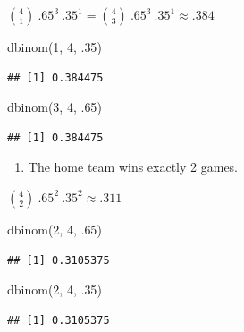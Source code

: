 \documentclass[
]{book}
\newenvironment{Shaded}{\begin{snugshade}}{\end{snugshade}}
\newcommand{\DecValTok}[1]{\textcolor[rgb]{0.00,0.00,0.81}{#1}}
\newcommand{\FunctionTok}[1]{\textcolor[rgb]{0.00,0.00,0.00}{#1}}
\newcommand{\NormalTok}[1]{#1}
\providecommand{\tightlist}{%
  \setlength{\itemsep}{0pt}\setlength{\parskip}{0pt}}
\theoremstyle{definition}
\theoremstyle{definition}
\theoremstyle{definition}
\theoremstyle{definition}
\theoremstyle{remark}
\begin{document}
\(\binom{4}{1}\ .65^3\ .35^1 = \binom{4}{3}\ .65^3\ .35^1 \approx .384\)

\begin{Shaded}
\begin{Highlighting}[]
\FunctionTok{dbinom}\NormalTok{(}\DecValTok{1}\NormalTok{, }\DecValTok{4}\NormalTok{, .}\DecValTok{35}\NormalTok{)}
\end{Highlighting}
\end{Shaded}

\begin{verbatim}
## [1] 0.384475
\end{verbatim}

\begin{Shaded}
\begin{Highlighting}[]
\FunctionTok{dbinom}\NormalTok{(}\DecValTok{3}\NormalTok{, }\DecValTok{4}\NormalTok{, .}\DecValTok{65}\NormalTok{)}
\end{Highlighting}
\end{Shaded}

\begin{verbatim}
## [1] 0.384475
\end{verbatim}

\begin{enumerate}
\def\labelenumi{(\alph{enumi})}
\setcounter{enumi}{1}
\tightlist
\item
  The home team wins exactly 2 games.
\end{enumerate}

\(\binom{4}{2}\ .65^2\ .35^2 \approx .311\)

\begin{Shaded}
\begin{Highlighting}[]
\FunctionTok{dbinom}\NormalTok{(}\DecValTok{2}\NormalTok{, }\DecValTok{4}\NormalTok{, .}\DecValTok{65}\NormalTok{)}
\end{Highlighting}
\end{Shaded}

\begin{verbatim}
## [1] 0.3105375
\end{verbatim}

\begin{Shaded}
\begin{Highlighting}[]
\FunctionTok{dbinom}\NormalTok{(}\DecValTok{2}\NormalTok{, }\DecValTok{4}\NormalTok{, .}\DecValTok{35}\NormalTok{)}
\end{Highlighting}
\end{Shaded}

\begin{verbatim}
## [1] 0.3105375
\end{verbatim}
\end{document}
